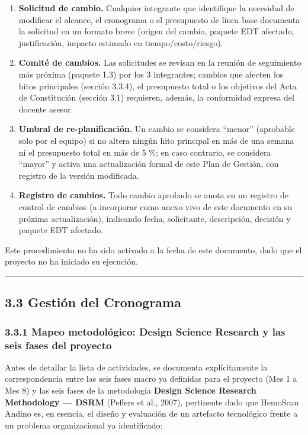 \documentclass[11pt,a4paper]{article}
\providecommand{\tightlist}{%
  \setlength{\itemsep}{0pt}\setlength{\parskip}{0pt}}
\begin{document}
\begin{enumerate}
\def\labelenumi{\arabic{enumi}.}
\tightlist
\item
  \textbf{Solicitud de cambio.} Cualquier integrante que identifique la necesidad de modificar el alcance, el cronograma o el presupuesto de línea base documenta la solicitud en un formato breve (origen del cambio, paquete EDT afectado, justificación, impacto estimado en tiempo/costo/riesgo).
\item
  \textbf{Comité de cambios.} Las solicitudes se revisan en la reunión de seguimiento más próxima (paquete 1.3) por los 3 integrantes; cambios que afecten los hitos principales (sección 3.3.4), el presupuesto total o los objetivos del Acta de Constitución (sección 3.1) requieren, además, la conformidad expresa del docente asesor.
\item
  \textbf{Umbral de re-planificación.} Un cambio se considera ``menor'' (aprobable solo por el equipo) si no altera ningún hito principal en más de una semana ni el presupuesto total en más de 5 \%; en caso contrario, se considera ``mayor'' y activa una actualización formal de este Plan de Gestión, con registro de la versión modificada.
\item
  \textbf{Registro de cambios.} Todo cambio aprobado se anota en un registro de control de cambios (a incorporar como anexo vivo de este documento en su próxima actualización), indicando fecha, solicitante, descripción, decisión y paquete EDT afectado.
\end{enumerate}

Este procedimiento no ha sido activado a la fecha de este documento, dado que el proyecto no ha iniciado su ejecución.

\begin{center}\rule{0.5\linewidth}{0.5pt}\end{center}

\subsection{3.3 Gestión del Cronograma}\label{gestiuxf3n-del-cronograma}

\subsubsection{3.3.1 Mapeo metodológico: Design Science Research y las seis fases del proyecto}\label{mapeo-metodoluxf3gico-design-science-research-y-las-seis-fases-del-proyecto}

Antes de detallar la lista de actividades, se documenta explícitamente la correspondencia entre las seis fases macro ya definidas para el proyecto (Mes 1 a Mes 8) y las seis fases de la metodología \textbf{Design Science Research Methodology --- DSRM} (Peffers et al., 2007), pertinente dado que HemoScan Andino es, en esencia, el diseño y evaluación de un artefacto tecnológico frente a un problema organizacional ya identificado:
\end{document}
